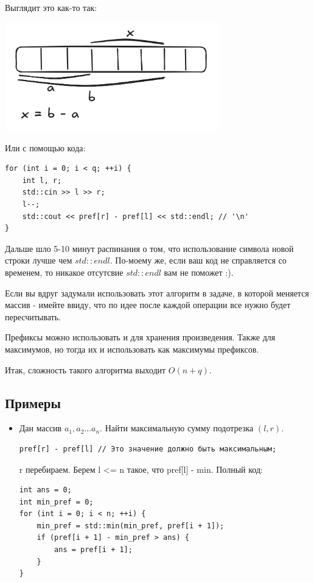 \documentclass[a4paper,12pt]{article}
\begin{document}
Выглядит это как-то так:

\begin{center}
	\includegraphics[width=0.7\textwidth]{../assets/prefsums.png}
\end{center}

Или с помощью кода:

\begin{verbatim}
for (int i = 0; i < q; ++i) {
    int l, r;
    std::cin >> l >> r;
    l--;
    std::cout << pref[r] - pref[l] << std::endl; // '\n'
}
\end{verbatim}

Дальше шло 5-10 минут распинания о том, что использование символа
новой строки лучше чем $std::endl$.
По-моему же, если ваш код не справляется со временем, то никакое
отсутсвие $std::endl$ вам не поможет :).

Если вы вдруг задумали использовать этот алгоритм в задаче, в которой меняется
массив - имейте ввиду, что по идее после каждой операции все нужно будет
пересчитывать.

Префиксы можно использовать и для хранения произведения. Также для максимумов,
но тогда их и использовать как максимумы префиксов.

Итак, сложность такого алгоритма выходит $O(n + q)$.

\subsection{Примеры}
\begin{itemize}
	\item Дан массив $a_1, a_2 \dots a_n$. Найти максимальную сумму
	      подотрезка $(l,r)$.
	      \begin{verbatim}
pref[r] - pref[l] // Это значение должно быть максимальным;
          \end{verbatim}
	      r перебираем. Берем l <= n такое, что pref[l] - min.
	      Полный код:
	      \begin{verbatim}
int ans = 0;
int min_pref = 0;
for (int i = 0; i < n; ++i) {
    min_pref = std::min(min_pref, pref[i + 1]);
    if (pref[i + 1] - min_pref > ans) {
        ans = pref[i + 1];
    }
}
          \end{verbatim}
\end{itemize}
\end{document}

